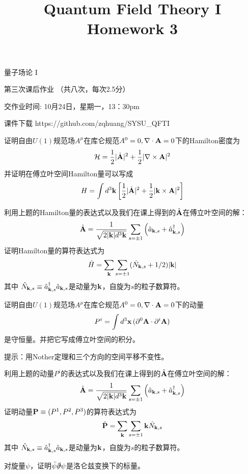 \documentclass[CJK]{beamer}
\title{Quantum Field Theory I \\ Homework 3}
\author{}
\date{}
\begin{document}
\begin{frame}
 
\begin{center}
\begin{Large}
\bch
量子场论 I 

{\vskip 0.3in}

第三次课后作业 （共八次，每次2.5分）

交作业时间: 10月24日，星期一，13：30pm

\ech
\end{Large}
\end{center}

\vskip 0.2in

\bch
课件下载
\ech
https://github.com/zqhuang/SYSU\_QFTI

\end{frame}

\begin{frame}
\bch
证明自由$U(1)$规范场$A^\mu$在库仑规范$A^0=0, \nabla\cdot {\mathbf{A}}=0$下的Hamilton密度为
$${\mathcal{H}} = \frac{1}{2}|\dot{{\mathbf{A}}}|^2 + \frac{1}{2}|\nabla\times {\mathbf{A}}|^2$$
并证明在傅立叶空间Hamilton量可以写成
$$H = \int d^3{\mathbf{k}}\left[\frac{1}{2}|\dot{{\mathbf{A}}}|^2 + \frac{1}{2}|{\mathbf{k}} \times {\mathbf{A}}|^2\right]$$
\ech
\end{frame}

\begin{frame}
\bch
利用上题的Hamilton量的表达式以及我们在课上得到的$\hat{{\mathbf{A}}}$在傅立叶空间的解：
$$\hat{{\mathbf{A}}} = \frac{1}{\sqrt{2|{\mathbf{k}}|d^3{\mathbf{k}}}}\sum_{s=\pm 1} \left({\hat{a}}_{{\mathbf{k}}, s} + {\hat{a}^\dagger}_{{\mathbf{k}}, s}\right)$$
证明Hamilton量的算符表达式为
$$\hat{H} = \sum_{{\mathbf{k}}} \sum_{s=\pm 1}(\hat{N}_{{\mathbf{k}},s}+1/2)|{\mathbf{k}}|$$
其中 $\hat{N}_{{\mathbf{k}}, s} \equiv {\hat{a}^\dagger}_{{\mathbf{k}},s}{\hat{a}}_{{\mathbf{k}}, s}$是动量为${\mathbf{k}}$，自旋为$s$的粒子数算符。
\ech
\end{frame}

\begin{frame}
\bch
证明自由$U(1)$规范场$A^\mu$在库仑规范$A^0=0, \nabla\cdot {\mathbf{A}}=0$下的动量
$$P^i = \int d^3{\mathbf{x}}\, (\partial^0{\mathbf{A}} \cdot \partial^i{\mathbf{A}})$$
是守恒量。并把它写成傅立叶空间的积分。
\skipline
\skipline

提示：用Nother定理和三个方向的空间平移不变性。 
\ech
\end{frame}


\begin{frame}
\bch
利用上题的动量$P^i$的表达式以及我们在课上得到的$\hat{{\mathbf{A}}}$在傅立叶空间的解：
$$\hat{{\mathbf{A}}} = \frac{1}{\sqrt{2|{\mathbf{k}}|d^3{\mathbf{k}}}}\sum_{s=\pm 1} \left({\hat{a}}_{{\mathbf{k}}, s} + {\hat{a}^\dagger}_{{\mathbf{k}}, s}\right)$$
证明动量${\mathbf{P}} \equiv (P^1, P^2, P^3)$的算符表达式为
$$\hat{{\mathbf{P}}} = \sum_{{\mathbf{k}}}\sum_{s = \pm 1} {\mathbf{k}} \hat{N}_{{\mathbf{k}}, s}$$
其中 $\hat{N}_{{\mathbf{k}}, s} \equiv {\hat{a}^\dagger}_{{\mathbf{k}},s}{\hat{a}}_{{\mathbf{k}}, s}$是动量为${\mathbf{k}}$，自旋为$s$的粒子数算符。
\ech
\end{frame}


\begin{frame}
\bch
对旋量$\psi$，证明$\bar\psi\slashed{\partial}\psi$是洛仑兹变换下的标量。
\ech
\end{frame}
\end{document}
